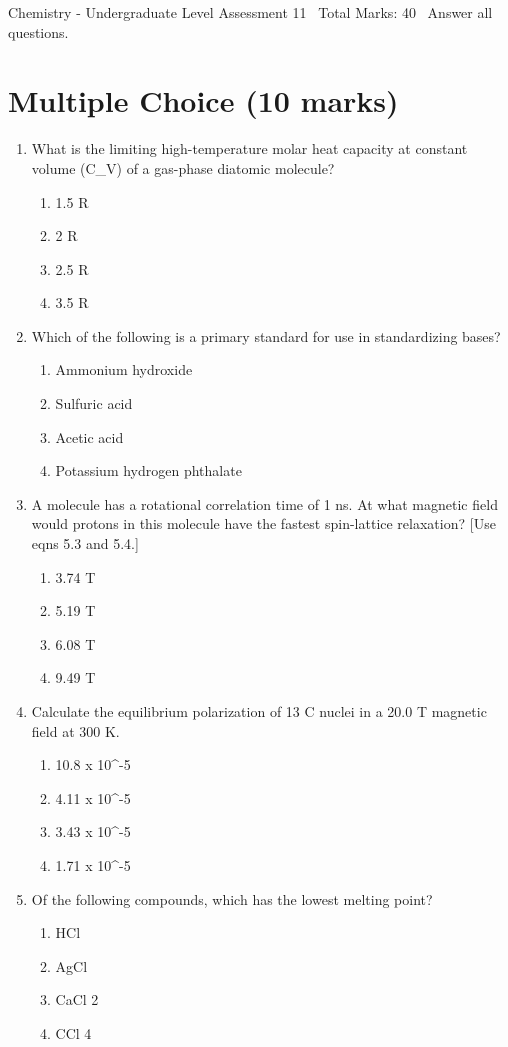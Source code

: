 \documentclass[12pt]{article}
\begin{document}
\begin{center}
Chemistry - Undergraduate Level Assessment 11 \
Total Marks: 40 \
Answer all questions.
\end{center}

\section*{Multiple Choice (10 marks)}
\begin{enumerate}[label=\arabic*.]
\item What is the limiting high-temperature molar heat capacity at constant volume (C\_V) of a gas-phase diatomic molecule?
\begin{enumerate}[label=(\alph*)]
    \item 1.5 R
    \item 2 R
    \item 2.5 R
    \item 3.5 R
\end{enumerate}
\item Which of the following is a primary standard for use in standardizing bases?
\begin{enumerate}[label=(\alph*)]
    \item Ammonium hydroxide
    \item Sulfuric acid
    \item Acetic acid
    \item Potassium hydrogen phthalate
\end{enumerate}
\item A molecule has a rotational correlation time of 1 ns. At what magnetic field would protons in this molecule have the fastest spin-lattice relaxation? [Use eqns 5.3 and 5.4.]
\begin{enumerate}[label=(\alph*)]
    \item 3.74 T
    \item 5.19 T
    \item 6.08 T
    \item 9.49 T
\end{enumerate}
\item Calculate the equilibrium polarization of 13 C nuclei in a 20.0 T magnetic field at 300 K.
\begin{enumerate}[label=(\alph*)]
    \item 10.8 x 10^-5
    \item 4.11 x 10^-5
    \item 3.43 x 10^-5
    \item 1.71 x 10^-5
\end{enumerate}
\item Of the following compounds, which has the lowest melting point?
\begin{enumerate}[label=(\alph*)]
    \item HCl
    \item AgCl
    \item CaCl 2
    \item CCl 4
\end{enumerate}
\end{enumerate}
\end{document}
